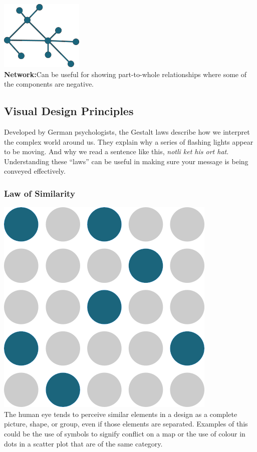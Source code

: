 \documentclass[
  a4paper,
  onecolumn,
  oneside]{book}
\begin{document}
\includegraphics{part1/images/flow3.png}\\
\textbf{Network:}Can be useful for showing part-to-whole relationships
where some of the components are negative.

\hypertarget{visual-design-principles}{%
\subsection{Visual Design Principles}\label{visual-design-principles}}

Developed by German psychologists, the Gestalt laws describe how we
interpret the complex world around us. They explain why a series of
flashing lights appear to be moving. And why we read a sentence like
this, \emph{notli ket his ort hat}. Understanding these ``laws'' can be
useful in making sure your message is being conveyed effectively.

\hypertarget{law-of-similarity}{%
\subsubsection{Law of Similarity}\label{law-of-similarity}}

\includegraphics{part1/images/lawofsimilarity.png}\\
The human eye tends to perceive similar elements in a design as a
complete picture, shape, or group, even if those elements are separated.
Examples of this could be the use of symbols to signify conflict on a
map or the use of colour in dots in a scatter plot that are of the same
category.
\end{document}
